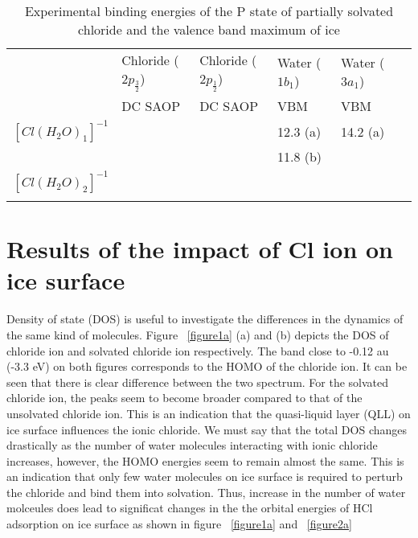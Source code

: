 \documentclass[a4paper,11pt]{report}
\begin{document}
\begin{table}[H]\small
\begin{center}
\caption{Experimental binding energies of the P state of partially solvated chloride and the valence band maximum of ice} \label{tab:1}
\begin{tabular}{|l|l|l|l|l|l|}
\hline
&Chloride ($2p_{\frac{3}{2}}$)&Chloride ($2p_{\frac{1}{2}}$)&Water ($1b_{1}$)&Water ($3a_{1}$)\\
&\hspace*{0.5cm} DC SAOP &\hspace*{0.5cm} DC SAOP &\hspace*{0.5cm}VBM &\hspace*{0.5cm}VBM\\ 
\hline
$[Cl(H_{2}O)_{1}]^{-1}$&\hspace*{0.5cm}&\hspace*{0.5cm}&\hspace*{0.5cm}12.3 (a)&\hspace*{0.5cm}14.2 (a)\\
&&&\hspace*{0.5cm}11.8 (b)&\\
\hline
$[Cl(H_{2}O)_{2}]^{-1}$&\hspace*{0.5cm}&\hspace*{0.5cm}&\hspace*{0.5cm}&\hspace*{0.5cm}\\
&&&&\\
\hline
\end{tabular}
\label{table1n}
\end{center}
\end{table}






\section{Results of the impact of Cl ion on ice surface}
Density of state (DOS) is useful to investigate the differences in the dynamics of the same kind of molecules. Figure ~\ref{figure1a} (a) and (b) depicts the DOS of chloride ion and solvated chloride ion respectively. The band close to -0.12 au (-3.3 eV) on both figures corresponds to the HOMO of the chloride ion. It can be seen that there is clear difference between the two spectrum. For the solvated chloride ion, the peaks seem to become broader compared to that of the unsolvated chloride ion. This is an indication that the quasi-liquid layer (QLL) on ice surface influences the ionic chloride. We must say that the total DOS changes drastically as the number of water molecules interacting with ionic chloride increases, however, the HOMO energies seem to remain almost the same. This is an indication that only few water molecules on ice surface is required to perturb the chloride and bind them into solvation. Thus, increase in the number of water molceules does lead to significat changes in the the orbital energies of HCl adsorption on ice surface as shown in figure ~\ref{figure1a} and ~\ref{figure2a}
\end{document}
